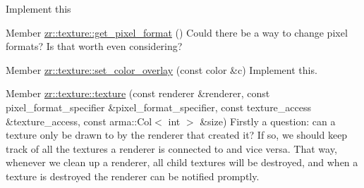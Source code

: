 \begin{DoxyRefList}
\label{todo__todo000010}%
%
Implement this  
\item[Member \mbox{\hyperlink{classzr_1_1texture_a4283a61fd2c01537d6e10e1807442173}{zr::texture::get\+\_\+pixel\+\_\+format}} ()]\label{todo__todo000012}%
%
Could there be a way to change pixel formats? Is that worth even considering? 
\item[Member \mbox{\hyperlink{classzr_1_1texture_a4e8b4e61c04447d3a94979e83a010927}{zr::texture::set\+\_\+color\+\_\+overlay}} (const color \&c)]\label{todo__todo000011}%
%
Implement this. 
\item[Member \mbox{\hyperlink{classzr_1_1texture_a90bc21e25a2889400253763294280924}{zr::texture::texture}} (const renderer \&renderer, const pixel\+\_\+format\+\_\+specifier \&pixel\+\_\+format\+\_\+specifier, const texture\+\_\+access \&texture\+\_\+access, const arma\+::\+Col$<$ int $>$ \&size)]\label{todo__todo000008}%
%
Firstly a question\+: can a texture only be drawn to by the renderer that created it? If so, we should keep track of all the textures a renderer is connected to and vice versa. That way, whenever we clean up a renderer, all child textures will be destroyed, and when a texture is destroyed the renderer can be notified promptly.
\end{DoxyRefList}